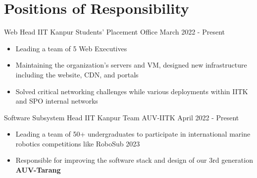 \section*{\sc Positions of Responsibility}
\vspace{-2mm}
\hrulefill
\vspace{1mm}

\cventry
{Web Head} %
{IIT Kanpur} %
{Students' Placement Office} %
{March 2022 - Present} %
{
  \begin{itemize} %
    \item Leading a team of 5 Web Executives 
    \item Maintaining the organization’s servers and VM, designed new infrastructure including the website, CDN, and portals
    \item Solved critical networking challenges while various deployments within IITK and SPO internal networks
  \end{itemize}
}

\cventry
{Software Subsystem Head}
{IIT Kanpur} %
{Team AUV-IITK} %
{April 2022 - Present} %
{
  \begin{itemize} %
    \item Leading a team of 50+ undergraduates to participate in international marine robotics competitions like RoboSub 2023 
    \item Responsible for improving the software stack and design of our 3rd generation \textbf{AUV-Tarang}
  \end{itemize}
}

